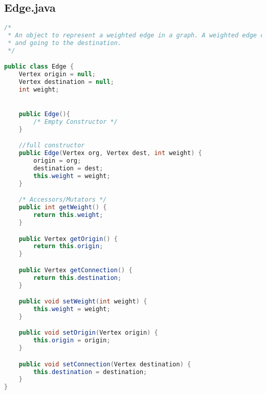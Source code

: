 \documentclass[letterpaper, 10pt,DIV=13]{scrartcl}
\numberwithin{equation}{section} %
\numberwithin{figure}{section} %
\numberwithin{table}{section} %
\begin{document}
\subsection{Edge.java}
\begin{lstlisting}[frame=single, language=java, breaklines]  
/*
 * An object to represent a weighted edge in a graph. A weighted edge can only have one direction, starting rom the origin
 * and going to the destination.
 */

public class Edge {
    Vertex origin = null;
    Vertex destination = null;
    int weight;


    public Edge(){
        /* Empty Constructor */
    }

    //full constructor
    public Edge(Vertex org, Vertex dest, int weight) {
        origin = org;
        destination = dest;
        this.weight = weight;
    }

    /* Accessors/Mutators */
    public int getWeight() {
        return this.weight;
    }

    public Vertex getOrigin() {
        return this.origin;
    }

    public Vertex getConnection() {
        return this.destination;
    }

    public void setWeight(int weight) {
        this.weight = weight;
    }

    public void setOrigin(Vertex origin) {
        this.origin = origin;
    }

    public void setConnection(Vertex destination) {
        this.destination = destination;
    }
}
\end{lstlisting}
\end{document}
